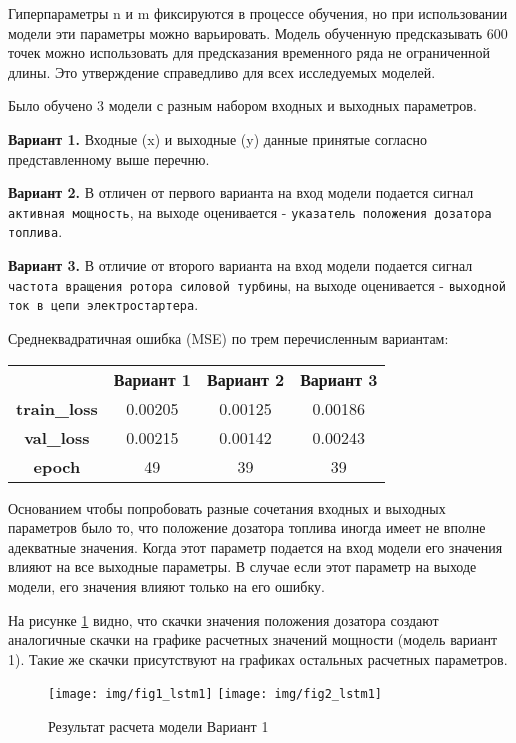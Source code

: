 \documentclass[12pt,a4paper]{article}
\begin{document}
Гиперпараметры n и m фиксируются в процессе обучения, но при использовании модели эти параметры можно варьировать. Модель обученную предсказывать 600 точек можно использовать для предсказания временного ряда не ограниченной длины. Это утверждение справедливо для всех исследуемых моделей.

Было обучено 3 модели с разным набором входных и выходных параметров.

{\bf Вариант 1.} Входные (x) и выходные (y) данные принятые согласно представленному выше перечню.

{\bf Вариант 2.} В отличен от первого варианта на вход модели подается сигнал \texttt{активная мощность}, на выходе оценивается - \texttt{указатель положения дозатора топлива}.

{\bf Вариант 3.} В отличие от второго варианта на вход модели подается сигнал \texttt{частота вращения ротора силовой турбины}, на выходе оценивается - \texttt{выходной ток в цепи электростартера}.

Среднеквадратичная ошибка (MSE) по трем перечисленным вариантам:

\begin{center}
\begin{tabular}{ |c|c|c|c| } 
	\hline
	 & {\bf Вариант 1} & {\bf Вариант 2} & {\bf Вариант 3} \\ 
	{\bf train\_loss} & 0.00205 & 0.00125 & 0.00186 \\ 
	{\bf val\_loss} & 0.00215 & 0.00142 & 0.00243 \\
	{\bf epoch} & 49 & 39 & 39 \\ 
	\hline
\end{tabular}
\end{center}

Основанием чтобы попробовать разные сочетания входных и выходных параметров было то, что положение дозатора топлива иногда имеет не вполне адекватные значения. Когда этот параметр подается на вход модели его значения влияют на все выходные параметры. В случае если этот параметр на выходе модели, его значения влияют только на его ошибку.

На рисунке \ref{fig:res_lstm1} видно, что скачки значения положения дозатора создают аналогичные скачки на графике расчетных значений мощности (модель вариант 1). Такие же скачки присутствуют на графиках остальных расчетных параметров.

\begin{figure}[htb]
	\centering\texttt{[image: img/fig1\_lstm1]}
	\centering\texttt{[image: img/fig2\_lstm1]}
	\caption{Результат расчета модели Вариант 1}
	\label{fig:res_lstm1}
\end{figure}
\end{document}
